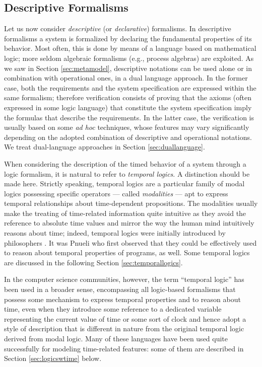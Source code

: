 \subsection{Descriptive Formalisms} \label{sec:descriptive} Let us now
consider \emph{descriptive} (or \emph{declarative}) formalisms.  In
descriptive formalisms a system is formalized by declaring the
fundamental properties of its behavior. Most often, this is done by
means of a language based on mathematical logic; more seldom algebraic
formalisms (e.g., process algebras) are exploited. As we saw in
Section \ref{sec:metamodel}, descriptive notations can be used alone
or in combination with operational ones, in a dual language
approach. In the former case, both the requirements and the system
specification are expressed within the same formalism; therefore
verification consists of proving that the axioms (often expressed in
some logic language) that constitute the system specification imply
the formulas that describe the requirements. In the latter case, the
verification is usually based on some \emph{ad hoc} techniques, whose
features may vary significantly depending on the adopted combination
of descriptive and operational notations. We treat dual-language
approaches in Section \ref{sec:duallanguage}.

When considering the description of the timed behavior of a system 
through a logic formalism, it is natural to refer to \emph{temporal 
logics}. A distinction should be made here. Strictly speaking, 
temporal logics are a particular family of modal logics \cite{Kri63,RU71} 
possessing specific operators --- called \emph{modalities} --- apt 
to express temporal relationships about time-dependent propositions. 
The modalities usually make the treating of time-related information 
quite intuitive as they avoid the  reference to absolute 
time values and mirror the way the human mind intuitively reasons 
about time; indeed, temporal logics were initially introduced 
by philosophers \cite{Kam68}. It was Pnueli who first observed \cite{Pnu77} 
that they could be effectively used to reason about temporal 
properties of programs, as well. Some temporal logics are discussed 
in the following Section \ref{sec:temporallogics}.

In the computer science communities, however, the term ``temporal 
logic'' has been used in a broader sense, encompassing all logic-based 
formalisms that possess some mechanism to express temporal properties 
and to reason about time, even when they introduce some  
reference to a dedicated variable representing the current value 
of time or some sort of clock and hence adopt a style of description 
that is different in nature from the original temporal logic 
derived from modal logic. Many of these languages have been used 
quite successfully for modeling time-related features: some of 
them are described in Section \ref{sec:logicswtime} below.

